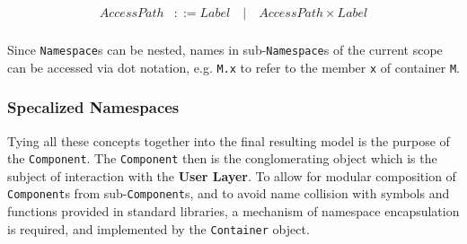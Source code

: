 \documentclass[a4paper]{article}
\newcommand\nmlClass[1]{{\tt #1}}
\begin{document}
\begin{equation*}
\begin{array}{ll}
   AccessPath & ::= Label  \quad \lvert \quad AccessPath \times Label \\
\end{array}
\end{equation*}

Since \nmlClass{Namespace}s can be nested, names in
sub-\nmlClass{Namespace}s of the current scope can be accessed via dot
notation, e.g. \verb^M.x^ to refer to the member \verb^x^ of container
\verb^M^.

\subsubsection{Specalized Namespaces}

Tying all these concepts together into the final resulting model is
the purpose of the \nmlClass{Component}.  The \nmlClass{Component} then is the
conglomerating object which is the subject of interaction with the
\textbf{User Layer}.  To allow for modular composition of \nmlClass{Component}s
from sub-\nmlClass{Component}s, and to avoid name collision with symbols and
functions provided in standard libraries, a mechanism of namespace
encapsulation is required, and implemented by the \nmlClass{Container} object.
\end{document}
